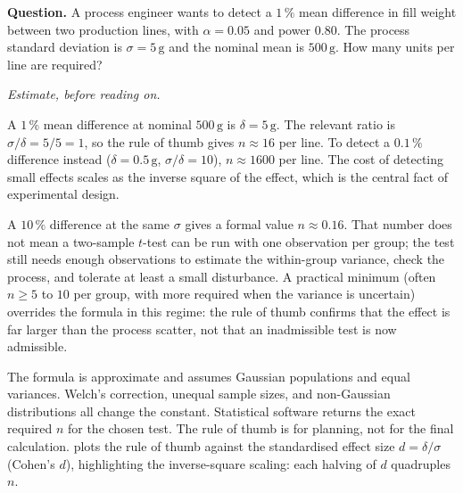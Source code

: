 \begin{estimation}
\textbf{Question.} A process engineer wants to detect a $1 \,\%$
mean difference in fill weight between two production lines, with
$\alpha = 0.05$ and power $0.80$. The process standard deviation is
$\sigma = 5 \,\si{\gram}$ and the nominal mean is $500 \,\si{\gram}$.
How many units per line are required?

\smallskip
\textit{Estimate, before reading on.}

\smallskip
A $1 \,\%$ mean difference at nominal $500 \,\si{\gram}$ is $\delta
= 5 \,\si{\gram}$. The relevant ratio is $\sigma/\delta = 5/5 = 1$,
so the rule of thumb gives $n \approx 16$ per line. To detect a
$0.1 \,\%$ difference instead ($\delta = 0.5 \,\si{\gram}$,
$\sigma/\delta = 10$), $n \approx 1600$ per line. The cost of
detecting small effects scales as the inverse square of the effect,
which is the central fact of experimental design.

A $10 \,\%$ difference at the same $\sigma$ gives a formal value
$n \approx 0.16$. That number does not mean a two-sample $t$-test
can be run with one observation per group; the test still needs
enough observations to estimate the within-group variance, check
the process, and tolerate at least a small disturbance. A practical
minimum (often $n \geq 5$ to $10$ per group, with more required
when the variance is uncertain) overrides the formula in this
regime: the rule of thumb confirms that the effect is far larger
than the process scatter, not that an inadmissible test is now
admissible.
\end{estimation}

The formula is approximate and assumes Gaussian populations and
equal variances. Welch's correction, unequal sample sizes, and
non-Gaussian distributions all change the constant. Statistical
software returns the exact required $n$ for the chosen test. The
rule of thumb is for planning, not for the final calculation.
 plots the rule of thumb
against the standardised effect size $d = \delta/\sigma$ (Cohen's
$d$), highlighting the inverse-square scaling: each halving of $d$
quadruples $n$.



